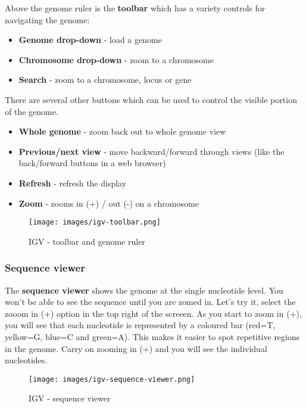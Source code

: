 \documentclass[11pt]{article}
\providecommand{\tightlist}{%
      \setlength{\itemsep}{0pt}\setlength{\parskip}{0pt}}
\begin{document}
Above the genome ruler is the \textbf{toolbar} which has a variety
controls for navigating the genome:

\begin{itemize}
\tightlist
\item
  \textbf{Genome drop-down} - load a genome
\item
  \textbf{Chromosome drop-down} - zoom to a chromosome
\item
  \textbf{Search} - zoom to a chromosome, locus or gene
\end{itemize}

There are several other buttons which can be used to control the visible
portion of the genome.

\begin{itemize}
\tightlist
\item
  \textbf{Whole genome} - zoom back out to whole genome view
\item
  \textbf{Previous/next view} - move backward/forward through views
  (like the back/forward buttons in a web browser)
\item
  \textbf{Refresh} - refresh the display
\item
  \textbf{Zoom} - zooms in (+) / out (-) on a chromosome
\end{itemize}

    \begin{figure}
\centering
\texttt{[image: images/igv-toolbar.png]}
\caption{IGV - toolbar and genome ruler}
\end{figure}

    \hypertarget{sequence-viewer}{%
\subsubsection{Sequence viewer}\label{sequence-viewer}}

The \textbf{sequence viewer} shows the genome at the single nucleotide
level. You won't be able to see the sequence until you are zomed in.
Let's try it, select the zooom in (+) option in the top right of the
screeen. As you start to zoom in (+), you will see that each nucleotide
is represented by a coloured bar (red=T, yellow=G, blue=C and green=A).
This makes it easier to spot repetitive regions in the genome. Carry on
zooming in (+) and you will see the individual nucleotides.

    \begin{figure}
\centering
\texttt{[image: images/igv-sequence-viewer.png]}
\caption{IGV - sequence viewer}
\end{figure}
\end{document}
